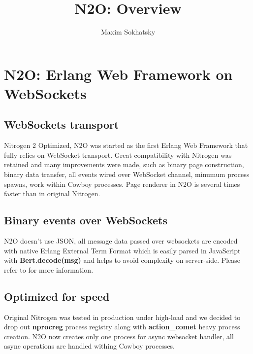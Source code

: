 \documentclass[11pt]{article}
\begin{document}
\title{N2O: Overview}
\author{Maxim Sokhatsky}

\paragraph{}
\section*{N2O: Erlang Web Framework on WebSockets}

\subsection*{WebSockets transport}
Nitrogen 2 Optimized, N2O was started as the first Erlang Web Framework
that fully relies on WebSocket transport. Great compatibility with Nitrogen
was retained and many improvements were made, such as binary page construction,
binary data transfer, all events wired over WebSocket channel, minumum process spawns,
work within Cowboy processes. Page renderer in N2O is several times faster
than in original Nitrogen.

\subsection*{Binary events over WebSockets}
N2O doesn't use JSON, all message data passed over websockets are encoded with
native Erlang External Term Format which is easily parsed in JavaScript
with {\bf Bert.decode(msg)} and helps to avoid complexity on server-side.
Please refer to  for more information.

\subsection*{Optimized for speed}
Original Nitrogen was tested in production under high-load and we decided to drop out
{\bf nprocreg} process registry along with {\bf{action\_comet}} heavy process creation. N2O now creates
only one process for async websocket handler, all async operations are handled withing
Cowboy processes.
\end{document}
